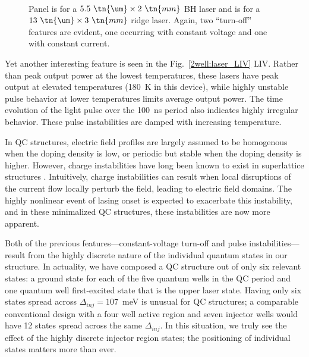 \begin{figure}[tp]%
\centering%
%
\\%
%
\caption[Pulsed LIV data for the two injector well structure (II)]{ Panel  is for a $5.5~\tn{\um}\times2~\tn{mm}$ BH laser and  is for a $13~\tn{\um}\times3~\tn{mm}$ ridge laser.  Again, two ``turn-off'' features are evident, one occurring with constant voltage and one with constant current.}
\label{2well:laser_LIV2}
\end{figure}


Yet another interesting feature is seen in the Fig.~\ref{2well:laser_LIV} LIV.  Rather than peak output power at the lowest temperatures, these lasers have peak output at elevated temperatures (180~K in this device), while highly unstable pulse behavior at lower temperatures limits average output power. The time evolution of the light pulse over the 100~ns period also indicates highly irregular behavior. These pulse instabilities are damped with increasing temperature.


In QC structures, electric field profiles are largely assumed to be homogenous when the doping density is low, or periodic but stable when the doping density is higher. However, charge instabilities have long been known to exist in superlattice structures \cite{Leo:book:2006}. Intuitively, charge instabilities can result when local disruptions of the current flow locally perturb the field, leading to electric field domains. The highly nonlinear event of lasing onset is expected to exacerbate this instability, and in these minimalized QC structures, these instabilities are now more apparent.

Both of the previous features---constant-voltage turn-off and pulse instabilities---result from the highly discrete nature of the individual quantum states in our structure.  In actuality, we have composed a QC structure out of only six relevant states: a ground state for each of the five quantum wells in the QC period and one quantum well first-excited state that is the upper laser state.  Having only six states spread across $\Delta_\textit{inj}=107$~meV is unusual for QC structures; a comparable conventional design with a four well active region and seven injector wells would have 12 states spread across the same $\Delta_\textit{inj}$. In this situation, we truly see the effect of the highly discrete injector region states; the positioning of individual states matters more than ever.

